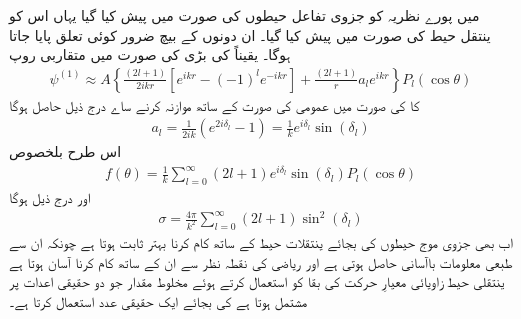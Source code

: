  میں پورے نظریہ کو جزوی تفاعل حیطوں  کی صورت میں پیش کیا گیا یہاں اس کو ینتقل حیط  کی صورت میں پیش کیا گیا۔ ان دونوں کے بیچ ضرور کوئی تعلق پایا جاتا ہوگا۔ یقیناً  کی بڑی  کی صورت میں متقاربی روپ 
\begin{align}
	\psi^{(1)}\approx A\left\{\frac{(2l+1)}{2ikr}\left[e^{ikr}-(-1)^le^{-ikr}\right]+\frac{(2l+1)}{r}a_le^{ikr}\right\}P_l(\cos\theta)
\end{align}
کا  کی صورت میں عمومی کی صورت  کے ساتھ موازنہ کرنے ساے درج ذیل حاصل ہوگا
\begin{align}
	a_l=\frac{1}{2ik}\left(e^{2i\delta_l}-1\right)=\frac{1}{k}e^{i\delta_l}\sin(\delta_l)
\end{align}
اس طرح بلخصوص  
\begin{align}
	f(\theta) = \frac{1}{k}\sum_{l=0}^{\infty}(2l+1)e^{i\delta_l}\sin(\delta_l)P_l(\cos\theta)
\end{align}
اور درج ذیل ہوگا  
\begin{align}
	\sigma=\frac{4\pi}{k^2}\sum_{l=0}^{\infty}(2l+1)\sin^2(\delta_l)
\end{align}
اب بھی جزوی موج حیطوں کی بجائے ینتقلات حیط کے ساتھ کام کرنا بہتر ثابت ہوتا ہے چونکہ ان سے طبعی معلومات باآسانی حاصل ہوتی ہے اور ریاضی کی نقطہ نظر سے ان کے ساتھ کام کرنا آسان ہوتا ہے ینتقلی حیط زاویائی معیارِ حرکت کی بقا کو استعمال کرتے ہوئے مخلوط مقدار  جو دو حقیقی اعدات پر مشتمل ہوتا ہے کی بجائے ایک حقیقی عدد  استعمال کرتا ہے۔

